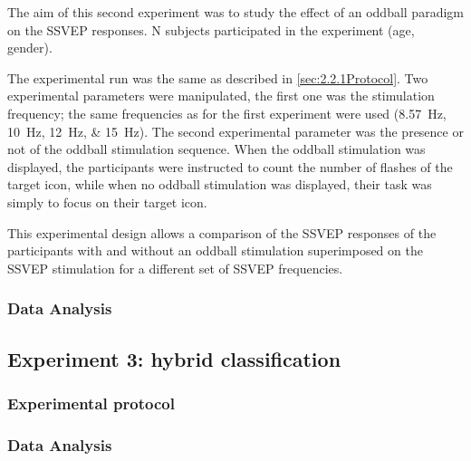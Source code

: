 \documentclass[10pt]{article}
\begin{document}
        The aim of this second experiment was to study the effect of an oddball paradigm on the SSVEP responses.
        N subjects participated in the experiment (age, gender).
        
        The experimental run was the same as described in \autoref{sec:2.2.1Protocol}.
        Two experimental parameters were manipulated, the first one was the stimulation frequency; the same frequencies as for the first experiment were used (\SIlist[list-units = single]{8.57;10;12;15}{\Hz}).
        The second experimental parameter was the presence or not of the oddball stimulation sequence.
        When the oddball stimulation was displayed, the participants were instructed to count the number of flashes of the target icon, while when no oddball stimulation was displayed, their task was simply to focus on their target icon.

        This experimental design allows a comparison of the SSVEP responses of the participants with and without an oddball stimulation superimposed on the SSVEP stimulation for a different set of SSVEP frequencies.
        

        \subsubsection{Data Analysis}
        \label{sec:2.3.2Analysis}


    \subsection{Experiment 3: hybrid classification}
    \label{sec:2.4Hybrid}

        \subsubsection{Experimental protocol}
        \label{sec:2.4.1Protocol}

        \subsubsection{Data Analysis}
        \label{sec:2.4.2Analysis}

\end{document}
